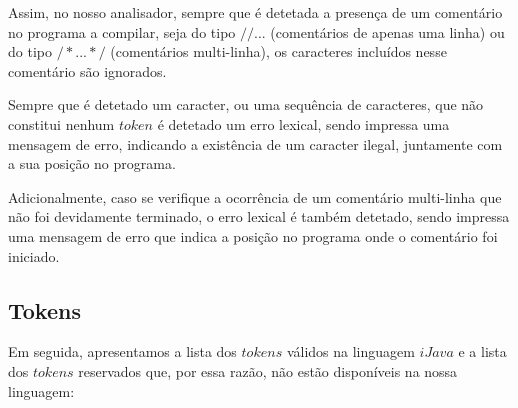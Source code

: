 \documentclass[11pt,a4paper]{article}
\begin{document}
Assim, no nosso analisador, sempre que é detetada a presença de um comentário no programa a compilar, seja do tipo $// ...$ (comentários de apenas uma linha) ou do tipo $/* ... */$ (comentários multi-linha), os caracteres incluídos nesse comentário são ignorados.

Sempre que é detetado um caracter, ou uma sequência de caracteres, que não constitui nenhum $token$ é detetado um erro lexical, sendo impressa uma mensagem de erro, indicando a existência de um caracter ilegal, juntamente com a sua posição no programa.

Adicionalmente, caso se verifique a ocorrência de um comentário multi-linha que não foi devidamente terminado, o erro lexical é também detetado, sendo impressa uma mensagem de erro que indica a posição no programa onde o comentário foi iniciado.

	\subsection{Tokens}

	Em seguida, apresentamos a lista dos $tokens$ válidos na linguagem $iJava$ e a lista dos $tokens$ reservados que, por essa razão, não estão disponíveis na nossa linguagem:
	
\end{document}
